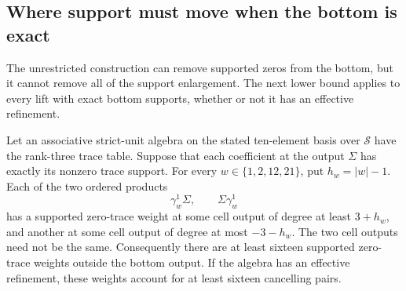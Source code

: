 \subsection{Where support must move when the bottom is exact}\label{sec:zero-bottom-tradeoff}
The unrestricted construction can remove supported zeros from the bottom, but it cannot remove all of the support enlargement. The next lower bound applies to every lift with exact bottom supports, whether or not it has an effective refinement.

\begin{proposition}\label{prop:zero-bottom-tradeoff}
Let an associative strict-unit algebra on the stated ten-element basis over $\mathcal S$ have the rank-three trace table. Suppose that each coefficient at the output $\Sigma$ has exactly its nonzero trace support. For every $w\in\{1,2,12,21\}$, put $h_w=|w|-1$. Each of the two ordered products
\[
 \gamma_w^1\Sigma,\qquad \Sigma\gamma_w^1
\]
has a supported zero-trace weight at some cell output of degree at least $3+h_w$, and another at some cell output of degree at most $-3-h_w$. The two cell outputs need not be the same. Consequently there are at least sixteen supported zero-trace weights outside the bottom output. If the algebra has an effective refinement, these weights account for at least sixteen cancelling pairs.
\end{proposition}

